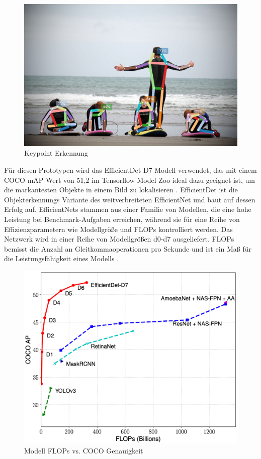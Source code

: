 \begin{figure}[htb]
	\centering
	\includegraphics[width=.9\textwidth]{images/keypoint-detection}
	\caption[Keypoint Erkennung]{Keypoint Erkennung \footnotemark}
	\label{fig:keypoint-detection}
\end{figure}

Für diesen Prototypen wird das EfficientDet-D7 Modell verwendet, das mit einem \ac{COCO}-\ac{mAP} Wert von 51,2 im Tensorflow Model Zoo ideal dazu geeignet ist, um die markantesten Objekte in einem Bild zu lokalisieren \cite{efficientdet}. EfficientDet ist die Objekterkennungs Variante des weitverbreiteten EfficientNet \cite{tan2019efficientnet} und baut auf dessen Erfolg auf. EfficientNets stammen aus einer Familie von Modellen, die eine hohe Leistung bei Benchmark-Aufgaben erreichen, während sie für eine Reihe von Effizienzparametern wie Modellgröße und \acp{FLOP} kontrolliert werden. Das Netzwerk wird in einer Reihe von Modellgrößen d0-d7 ausgeliefert. \acp{FLOP} bemisst die Anzahl an Gleitkommaoperationen pro Sekunde und ist ein Maß für die Leistungsfähigkeit eines Modells \cite{object_detection_comparison}. 

\begin{figure}[htb]
	\centering
	\includegraphics[width=\textwidth]{images/efficientdet}
	\caption[Modell FLOPs vs COCO Genauigkeit]{Modell \acp{FLOP} vs. \ac{COCO} Genauigkeit \cite{tan2020efficientdet}}
\end{figure}

